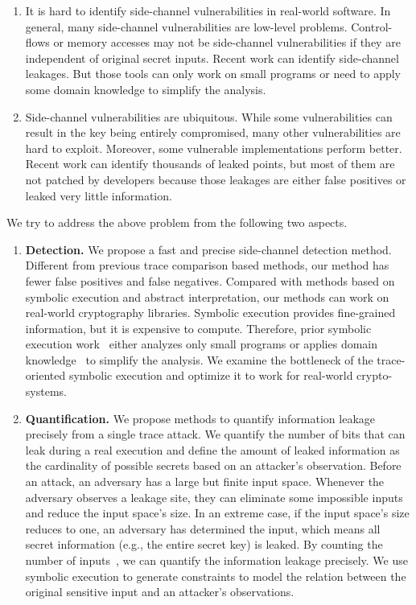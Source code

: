 \begin{enumerate}
    \item It is hard to identify side-channel vulnerabilities in real-world software. In general, many side-channel vulnerabilities are low-level problems. Control-flows or memory accesses may not be side-channel vulnerabilities if they are independent of original secret inputs. Recent work can identify side-channel leakages. But those tools can only work on small programs or need to apply some domain knowledge to simplify the analysis.
    \item Side-channel vulnerabilities are ubiquitous. While some vulnerabilities can result in the key being entirely compromised, many other vulnerabilities are hard to exploit. Moreover, some vulnerable implementations perform better. Recent work can identify thousands of leaked points, but most of them are not patched by developers because those leakages are either false positives or leaked very little information.
\end{enumerate}

We try to address the above problem from the following two aspects.
\begin{enumerate}
    \item \textbf{Detection.} We propose a fast and precise side-channel detection method. Different from previous trace comparison based methods, our method has fewer false positives and false negatives. Compared with methods based on symbolic execution and abstract interpretation, our methods can work on real-world cryptography libraries. Symbolic execution provides fine-grained information, but it is expensive to compute. Therefore, prior symbolic
          execution work~\cite{203878,236338,Brotzman19Casym} either analyzes only
          small programs or applies domain knowledge~\cite{203878} to simplify the analysis. We examine the bottleneck of the trace-oriented symbolic execution and optimize it to work for real-world crypto-systems.
    \item \textbf{Quantification.} We propose methods to quantify information
          leakage precisely from a single trace attack. We quantify the number of bits that can leak during a real execution and define the amount of leaked information as the cardinality of possible secrets based on an attacker's observation. Before an attack, an adversary has a large but finite input space. Whenever the adversary observes a leakage site, they can eliminate some impossible inputs and reduce the input space's size. In an extreme case, if the input space's size reduces to one, an adversary has determined the input, which means all secret information (e.g., the entire secret key) is
          leaked. By counting the number of inputs~\cite{10.1007/11499107_24}, we can quantify the information leakage precisely. We use symbolic execution to generate constraints to model the relation
          between the original sensitive input and an attacker's observations.
\end{enumerate}


